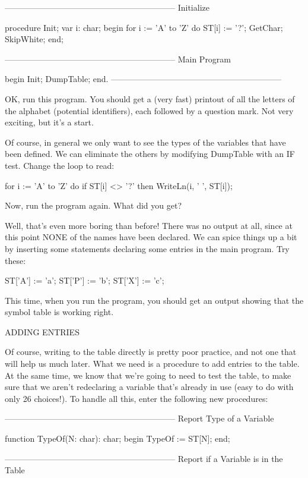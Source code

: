 \documentclass[float=false, crop=false]{standalone}
\begin{document}
{--------------------------------------------------------------}
{ Initialize }

procedure Init;
var i: char;
begin
   for i := 'A' to 'Z' do
      ST[i] := '?';
   GetChar;
   SkipWhite;
end;


{--------------------------------------------------------------}
{ Main Program }

begin
   Init;
   DumpTable;
end.
{--------------------------------------------------------------}


OK, run this program.  You  should  get a (very fast) printout of
all the letters of  the  alphabet  (potential  identifiers), each
followed by  a  question  mark.    Not  very exciting, but it's a
start.

Of course, in general we  only  want  to  see  the  types  of the
variables that have been defined.  We can eliminate the others by
modifying DumpTable with an IF test.  Change the loop to read:


  for i := 'A' to 'Z' do
     if ST[i] <> '?' then
         WriteLn(i, ' ', ST[i]);


Now, run the program again.  What did you get?

Well, that's even more  boring  than before!  There was no output
at all, since at this point NONE of the names have been declared.
We  can  spice  things up a  bit  by  inserting  some  statements
declaring some entries in the main program.  Try these:


     ST['A'] := 'a';
     ST['P'] := 'b';
     ST['X'] := 'c';


This time, when  you  run  the  program, you should get an output
showing that the symbol table is working right.


ADDING ENTRIES

Of course, writing to the table directly is pretty poor practice,
and not one that will  help  us  much  later.   What we need is a
procedure to add entries to the table.  At the same time, we know
that  we're going to need to test the table, to make sure that we
aren't redeclaring a variable that's already in use  (easy  to do
with only 26 choices!).  To handle all this, enter  the following
new procedures:


{--------------------------------------------------------------}
{ Report Type of a Variable }


function TypeOf(N: char): char;
begin
   TypeOf := ST[N];
end;


{--------------------------------------------------------------}
{ Report if a Variable is in the Table }
\end{document}

